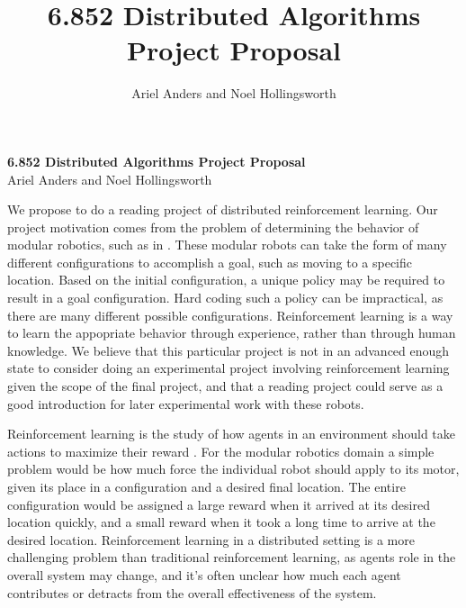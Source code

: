 \documentclass[12pt]{article}
\title{6.852 Distributed Algorithms Project Proposal}
\author{Ariel Anders and Noel Hollingsworth}
\begin{document}
\begin{center}{\bf \Large
6.852 Distributed Algorithms Project Proposal\\ }
Ariel Anders and Noel Hollingsworth 
\end{center}
We propose to do a reading project of distributed reinforcement learning. Our project motivation comes from the problem of determining the behavior of modular robotics, such as in \cite{modrobots}. These modular robots can take the form of many different configurations to accomplish a goal, such as moving to a specific location.   Based on the initial configuration, a unique policy may be required to result in a goal configuration. Hard coding such a policy  can be impractical, as there are many different possible configurations. Reinforcement learning is a way to learn the appopriate behavior through experience, rather than through human knowledge. We believe that this particular project is not in an advanced enough state to consider doing an experimental project involving reinforcement learning given the scope of the final project, and that a reading project could serve as a good introduction for later experimental work with these robots.\par

Reinforcement learning is the study of how agents in an environment should take actions to maximize their reward \cite{reinforcement}. For the modular robotics domain a simple problem would be how much force the individual robot should apply to its motor, given its place in a configuration and a desired final location. The entire configuration would be assigned a large reward when it arrived at its desired location quickly, and a small reward when it took a long time to arrive at the desired location. Reinforcement learning in a distributed setting is a more challenging problem than traditional reinforcement learning, as agents role in the overall system may change, and it's often unclear how much each agent contributes or detracts from the overall effectiveness of the system.\par
\end{document}
